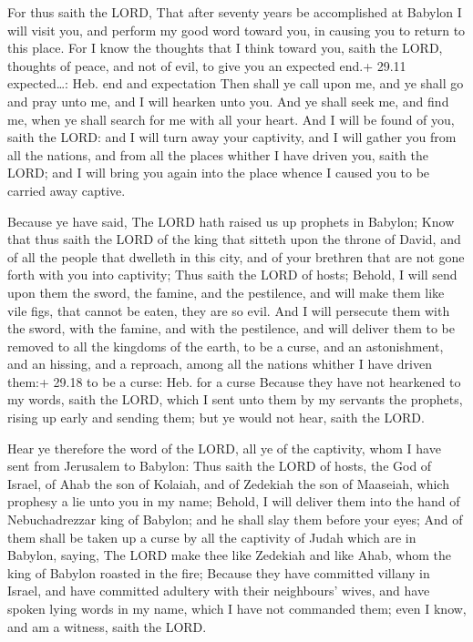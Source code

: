  For thus saith the LORD, That after seventy years be
accomplished at Babylon I will visit you, and perform my good word
toward you, in causing you to return to this place.  For I
know the thoughts that I think toward you, saith the LORD, thoughts of
peace, and not of evil, to give you an expected end.+ 29.11
expected\ldots: Heb. end and expectation  Then shall ye
call upon me, and ye shall go and pray unto me, and I will hearken unto
you.  And ye shall seek me, and find me, when ye shall
search for me with all your heart.  And I will be found of
you, saith the LORD: and I will turn away your captivity, and I will
gather you from all the nations, and from all the places whither I have
driven you, saith the LORD; and I will bring you again into the place
whence I caused you to be carried away captive.

 Because ye have said, The LORD hath raised us up
prophets in Babylon;  Know that thus saith the LORD of the
king that sitteth upon the throne of David, and of all the people that
dwelleth in this city, and of your brethren that are not gone forth with
you into captivity;  Thus saith the LORD of hosts; Behold,
I will send upon them the sword, the famine, and the pestilence, and
will make them like vile figs, that cannot be eaten, they are so evil.
 And I will persecute them with the sword, with the famine,
and with the pestilence, and will deliver them to be removed to all the
kingdoms of the earth, to be a curse, and an astonishment, and an
hissing, and a reproach, among all the nations whither I have driven
them:+ 29.18 to be a curse: Heb. for a curse  Because they
have not hearkened to my words, saith the LORD, which I sent unto them
by my servants the prophets, rising up early and sending them; but ye
would not hear, saith the LORD.

 Hear ye therefore the word of the LORD, all ye of the
captivity, whom I have sent from Jerusalem to Babylon: 
Thus saith the LORD of hosts, the God of Israel, of Ahab the son of
Kolaiah, and of Zedekiah the son of Maaseiah, which prophesy a lie unto
you in my name; Behold, I will deliver them into the hand of
Nebuchadrezzar king of Babylon; and he shall slay them before your eyes;
 And of them shall be taken up a curse by all the captivity
of Judah which are in Babylon, saying, The LORD make thee like Zedekiah
and like Ahab, whom the king of Babylon roasted in the fire;
 Because they have committed villany in Israel, and have
committed adultery with their neighbours' wives, and have spoken lying
words in my name, which I have not commanded them; even I know, and am a
witness, saith the LORD.

